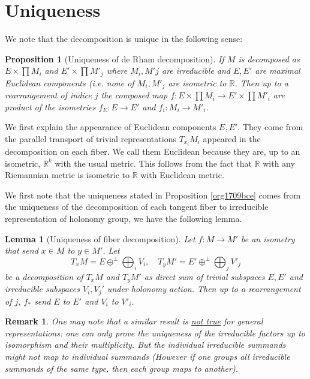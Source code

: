 \documentclass[11pt]{article}
\newtheorem{remark}{Remark}
\newtheorem{lemma}[theorem]{Lemma}
\newtheorem{proposition}{Proposition}[theorem]
\begin{document}
\section{Uniqueness}
\label{sec:orgc58d4d5}
We note that the decomposition is unique in the following sense: 

\begin{proposition}[Uniqueness of de Rham decomposition]
\label{prop:uniqueness}
\label{org1709bce}
If \(M\) is decomposed as \(E\times \prod M_i\) and \(E'\times\prod M'_j\) where \(M_i, M'j\) are
irreducible and \(E,E'\) are maximal Euclidean components (i.e. none of \(M_i, M'_j\) are isometric to \(\mathbb{R}\). Then up to a rearrangement of indice \(j\) the composed map \(f: E\times\prod M_i
\longrightarrow E'\times \prod M'_i\) are product of the isometries \(f_E: E\longrightarrow E'\) and
\(f_i:M_i \longrightarrow M'_i\).
\end{proposition}

We first explain the appearance of Euclidean components \(E,E'\). They come from the parallel
transport of trivial representations \(T_{x_i}M_i\) appeared in the decomposition on each fiber. We call them
Euclidean because they are, up to an isometric, \(\mathbb{R}^k\) with the usual metric. This follows
from the fact that \(\mathbb{R}\) with any Riemannian metric is isometric to \(\mathbb{R}\) with
Euclidean metric.

We first note that the uniqueness stated in Proposition \ref{org1709bce} comes from the uniqueness of
the decomposition of each tangent fiber to irreducible representation of holonomy group, we have the
following lemma.

\begin{lemma}[Uniqueness of fiber decomposition]
\label{lem:uniqueness-fiber}
\label{org05f4ec7}
Let \(f: M\longrightarrow M'\) be an isometry that send \(x\in M\) to \(y\in M'\). Let 
\[
T_x M = E \oplus^\perp \bigoplus_i V_i,\quad T_yM' = E' \oplus^\perp \bigoplus_j V'_j
\]
be a decomposition of \(T_xM\) and \(T_yM'\) as direct sum of trivial subspaces \(E,E'\) and irreducible
subspaces \(V_i, V_j'\) under holonomy action. Then up to a rearrangement of \(j\), \(f_*\) send \(E\) to
\(E'\) and \(V_i\) to \(V'_i\). 
\end{lemma}

\begin{remark}
One may note that a similar result is \uline{not true} for general representations: one can only prove the
uniqueness of the irreducible factors up to isomorphism and their multiplicity. But the individual irreducible
summands might not map to individual summands (However if one groups all irreducible summands of
the same type, then each group maps to another).
\end{remark}
\end{document}
